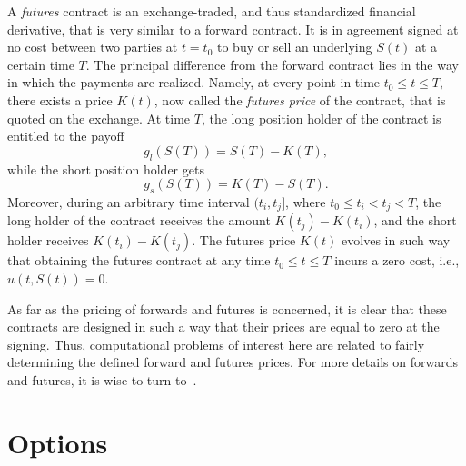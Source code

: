 \documentclass{UUThesisTemplate}
\begin{document}
\par
A \emph{futures} contract is an exchange-traded, and thus standardized financial derivative, that is very similar to a forward contract. It is in agreement signed at no cost between two parties at $t=t_0$ to buy or sell an underlying $S(t)$ at a certain time $T$. The principal difference from the forward contract lies in the way in which the payments are realized. Namely, at every point in time $t_0 \leq t \leq T$, there exists a price $K(t)$, now called the \emph{futures price} of the contract, that is quoted on the exchange. At time $T$, the long position holder of the contract is entitled to the payoff 
$$g_l(S(T))=S(T)-K(T),$$
while the short position holder gets 
$$g_s(S(T))=K(T)-S(T).$$
Moreover, during an arbitrary time interval $(t_i,t_j]$, where $t_0 \leq t_i < t_j < T$, the long holder of the contract receives the amount $K(t_j)-K(t_i)$, and the short holder receives $K(t_i)-K(t_j)$. The futures price $K(t)$ evolves in such way that obtaining the futures contract at any time $t_0 \leq t \leq T$ incurs a zero cost, i.e., $u(t,S(t))=0$. 

\par
As far as the pricing of forwards and futures is concerned, it is clear that these contracts are designed in such a way that their prices are equal to zero at the signing. Thus, computational problems of interest here are related to fairly determining the defined forward and futures prices. For more details on forwards and futures, it is wise to turn to~\cite{duffie1989futures,hull2017options}.  
%





%
\section{Options}
\label{sec:options}
\end{document}
